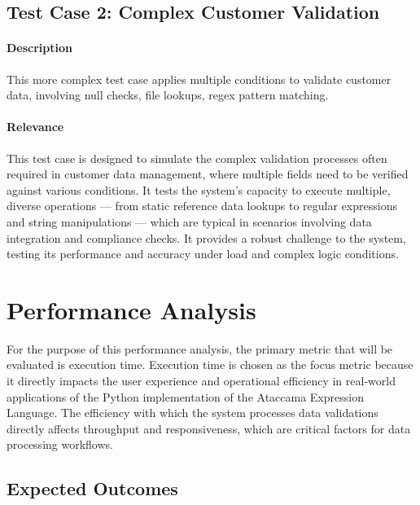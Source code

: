 \subsection{Test Case 2: Complex Customer Validation}

\paragraph{Description} This more complex test case applies multiple conditions to validate customer data, involving null checks, file lookups, regex pattern matching.

\paragraph{Relevance} This test case is designed to simulate the complex validation processes often required in customer data management, where multiple fields need to be verified against various conditions. It tests the system’s capacity to execute multiple, diverse operations — from static reference data lookups to regular expressions and string manipulations — which are typical in scenarios involving data integration and compliance checks. It provides a robust challenge to the system, testing its performance and accuracy under load and complex logic conditions.


\section{Performance Analysis}


For the purpose of this performance analysis, the primary metric that will be evaluated is execution time. Execution time is chosen as the focus metric because it directly impacts the user experience and operational efficiency in real-world applications of the Python implementation of the Ataccama Expression Language. The efficiency with which the system processes data validations directly affects throughput and responsiveness, which are critical factors for data processing workflows.


\subsection{Expected Outcomes}

